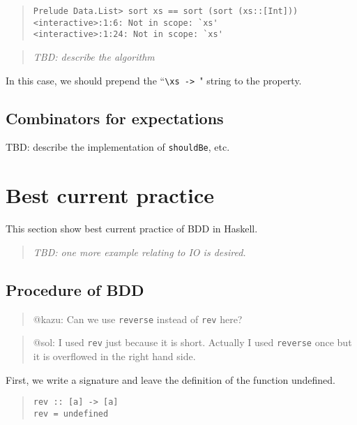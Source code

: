\documentclass[preprint]{sigplanconf}
\begin{document}
\begin{quote}
\small
\begin{verbatim}
Prelude Data.List> sort xs == sort (sort (xs::[Int]))
<interactive>:1:6: Not in scope: `xs'
<interactive>:1:24: Not in scope: `xs'
\end{verbatim}
\end{quote}

\begin{quote}
    \emph{TBD: describe the algorithm}
\end{quote}


\noindent In this case, we should prepend the ``\verb|\xs -> |" string
to the property.

\subsection{Combinators for expectations}

TBD: describe the implementation of {\tt shouldBe}, etc.


\section{Best current practice}
\label{ref:Best-current-practice}

This section show best current practice of
BDD in Haskell.

\begin{quote}
    \emph{TBD: one more example relating to IO is desired.}
\end{quote}

\subsection{Procedure of BDD}

\begin{quote}
@kazu: Can we use \verb|reverse| instead of \verb|rev| here?
\end{quote}

\begin{quote}
@sol: I used \verb|rev| just because it is short.
Actually I used \verb|reverse| once but it is overflowed
in the right hand side.
\end{quote}

First, we write a signature and leave the definition of the function undefined.

\begin{quote}
\small
\begin{verbatim}
rev :: [a] -> [a]
rev = undefined
\end{verbatim}
\end{quote}
\end{document}
